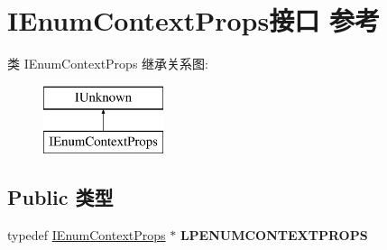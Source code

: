 \hypertarget{interface_i_enum_context_props}{}\section{I\+Enum\+Context\+Props接口 参考}
\label{interface_i_enum_context_props}
类 I\+Enum\+Context\+Props 继承关系图\+:\begin{figure}[H]
\begin{center}
\leavevmode
\includegraphics[height=2.000000cm]{interface_i_enum_context_props}
\end{center}
\end{figure}
\subsection*{Public 类型}
\begin{DoxyCompactItemize}
\item 
\mbox{\label{interface_i_enum_context_props_af54837b879f1d1aca8a34b971729d892}} 
typedef \hyperlink{interface_i_enum_context_props}{I\+Enum\+Context\+Props} $\ast$ {\bfseries L\+P\+E\+N\+U\+M\+C\+O\+N\+T\+E\+X\+T\+P\+R\+O\+PS}
\end{DoxyCompactItemize}
